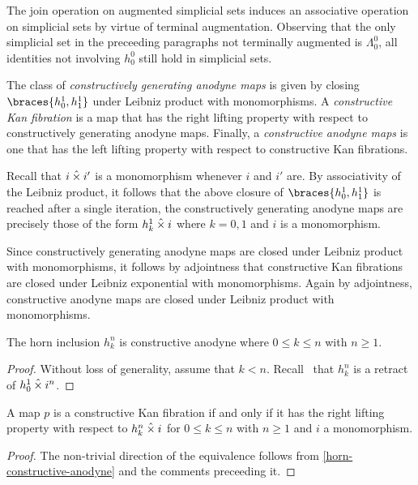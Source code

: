 \documentclass[reqno,10pt,a4paper,oneside]{amsart}
\begin{document}
The join operation on augmented simplicial sets induces an associative operation on simplicial sets by virtue of terminal augmentation.
Observing that the only simplicial set in the preceeding paragraphs not terminally augmented is $\Lambda_0^0$, all identities not involving $h_0^0$ still hold in simplicial sets.

\begin{definition}
The class of \emph{constructively generating anodyne maps} is given by closing $\braces{h_0^1, h_1^1}$ under Leibniz product with monomorphisms.
A \emph{constructive Kan fibration} is a map that has the right lifting property with respect to constructively generating anodyne maps.
Finally, a \emph{constructive anodyne maps} is one that has the left lifting property with respect to constructive Kan fibrations.
\end{definition}

Recall that $i \mathbin{\hat{\times}} i'$ is a monomorphism whenever $i$ and $i'$ are.
By associativity of the Leibniz product, it follows that the above closure of $\braces{h_0^1, h_1^1}$ is reached after a single iteration, \ie the constructively generating anodyne maps are precisely those of the form $h_k^1 \mathbin{\hat{\times}} i$ where $k = 0, 1$ and $i$ is a monomorphism.

Since constructively generating anodyne maps are closed under Leibniz product with monomorphisms, it follows by adjointness that constructive Kan fibrations are closed under Leibniz exponential with monomorphisms.
Again by adjointness, constructive anodyne maps are closed under Leibniz product with monomorphisms.

\begin{lemma}
\label{horn-constructive-anodyne}
The horn inclusion $h_k^n$ is constructive anodyne where $0 \leq k \leq n$ with $n \geq 1$.
\end{lemma}

\begin{proof}
Without loss of generality, assume that $k < n$.
Recall~\cite[Proposition~2.1.2.6]{lurie:htt} that $h_k^n$ is a retract of $h_0^1 \mathbin{\hat{\times}} i^n$.
\end{proof}

\begin{proposition}
A map $p$ is a constructive Kan fibration if and only if it has the right lifting property with respect to $h_k^n \mathbin{\hat{\times}} i$ for $0 \leq k \leq n$ with $n \geq 1$ and $i$ a monomorphism.
\end{proposition}

\begin{proof}
The non-trivial direction of the equivalence follows from \cref{horn-constructive-anodyne} and the comments preceeding it.
\end{proof}
\end{document}
